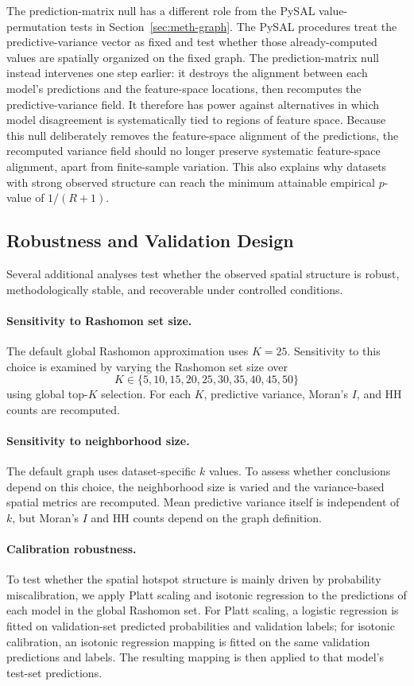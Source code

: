 The prediction-matrix null has a different role from the PySAL value-permutation tests
in Section~\ref{sec:meth-graph}. The PySAL procedures treat the predictive-variance
vector as fixed and test whether those already-computed values are spatially organized
on the fixed graph. The prediction-matrix null instead intervenes one step earlier: it
destroys the alignment between each model's predictions and the feature-space locations,
then recomputes the predictive-variance field. It therefore has power against alternatives
in which model disagreement is systematically tied to regions of feature space. Because
this null deliberately removes the feature-space alignment of the predictions, the recomputed
variance field should no longer preserve systematic feature-space alignment, apart from finite-sample variation. This also
explains why datasets with strong observed structure can reach the minimum attainable
empirical $p$-value of $1/(R+1)$.

\subsection{Robustness and Validation Design}
\label{sec:framework-robustness-validation}

Several additional analyses test whether the observed spatial structure is robust,
methodologically stable, and recoverable under controlled conditions.

\paragraph{Sensitivity to Rashomon set size.}
The default global Rashomon approximation uses $K=25$. Sensitivity to this choice is examined
by varying the Rashomon set size over
\[
K \in \{5, 10, 15, 20, 25, 30, 35, 40, 45, 50\}
\]
using global top-$K$ selection. For each $K$,
predictive variance, Moran's $I$, and HH counts are recomputed.

\paragraph{Sensitivity to neighborhood size.}
The default graph uses dataset-specific $k$ values. To assess whether conclusions depend
on this choice, the neighborhood size is varied and the variance-based spatial metrics are
recomputed. Mean predictive variance itself is independent of $k$, but Moran's $I$ and HH
counts depend on the graph definition.

\paragraph{Calibration robustness.}
\label{sec:exp-calibration}
To test whether the spatial hotspot structure is mainly driven by probability
miscalibration, we apply Platt scaling and isotonic regression to the predictions of each
model in the global Rashomon set. For Platt scaling, a logistic regression is fitted on 
validation-set predicted probabilities and validation labels; for isotonic calibration, 
an isotonic regression mapping is fitted on the same validation predictions and labels. 
The resulting mapping is then applied to that model's test-set predictions.

